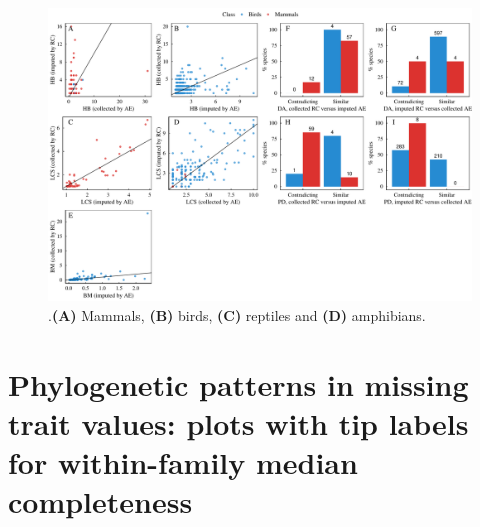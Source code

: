 \documentclass[11pt]{article}
\begin{document}
\begin{landscape}

\begin{figure}[h!]
\centering
\includegraphics[scale=0.6]{figures/Comparison_Cooke/Comparison_imputed_VS_collected}
\caption[]{\textbf{}.\textbf{(A)} Mammals, \textbf{(B)} birds, \textbf{(C)} reptiles and \textbf{(D)} amphibians.}
\label{compCooke}
\end{figure}

\end{landscape}

\pagebreak
\section{Phylogenetic patterns in missing trait values: plots with tip labels for within-family median completeness}

\pagebreak
\end{document}
